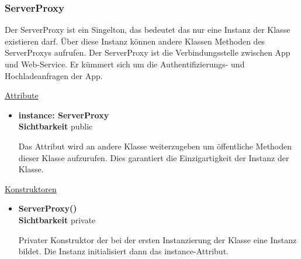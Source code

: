 \subsubsection{ServerProxy} \label{app:klasse:ServerProxy}
Der ServerProxy ist ein Singelton, das bedeutet das nur eine Instanz der  Klasse existieren darf. Über diese Instanz können andere Klassen Methoden des ServerProxys aufrufen. Der ServerProxy ist die Verbindungsstelle zwischen App und Web-Service. Er kümmert sich um die Authentifizierungs- und Hochladeanfragen der App.\newline

\underline{Attribute}
\begin{itemize}
\itemsep0pt
\item \textbf{instance: ServerProxy} \hfill\\ 
\textbf{Sichtbarkeit} public

Das Attribut wird an andere Klasse weiterzugeben um öffentliche Methoden dieser Klasse aufzurufen. Dies garantiert die Einzigartigkeit der Instanz der Klasse. 

\end{itemize}

\underline{Konstruktoren}
\begin{itemize}
\itemsep0pt
\item \textbf{ServerProxy()} \hfill\\
\textbf{Sichtbarkeit} private

Privater Konstruktor der bei der ersten Instanzierung der Klasse eine Instanz bildet. Die Instanz initialisiert dann das instance-Attribut. 
\end{itemize}

